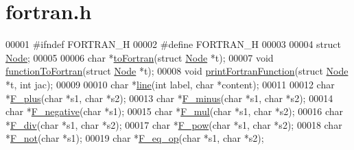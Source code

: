 \hypertarget{fortran_8h_source}{\section{fortran.\-h}
}

\begin{DoxyCode}
00001 \textcolor{preprocessor}{#ifndef FORTRAN\_H}
00002 \textcolor{preprocessor}{}\textcolor{preprocessor}{#define FORTRAN\_H}
00003 \textcolor{preprocessor}{}
00004 \textcolor{keyword}{struct }\hyperlink{structNode}{Node};
00005 
00006 \textcolor{keywordtype}{char} *\hyperlink{fortran_8c_a712ba008f0345618c5b1b87358a0206e}{toFortran}(\textcolor{keyword}{struct} \hyperlink{structNode}{Node} *t);
00007 \textcolor{keywordtype}{void} \hyperlink{fortran_8c_a2222da9d792b8540ffba7e25fbf4e4a4}{functionToFortran}(\textcolor{keyword}{struct} \hyperlink{structNode}{Node} *t);
00008 \textcolor{keywordtype}{void} \hyperlink{fortran_8c_a6d57af6f238f091e9c62b9ed81f194a3}{printFortranFunction}(\textcolor{keyword}{struct} \hyperlink{structNode}{Node} *t, \textcolor{keywordtype}{int} jac);
00009 
00010 \textcolor{keywordtype}{char} *\hyperlink{fortran_8c_a9a1c3a7f211f7d42c6dedcdaed68067e}{line}(\textcolor{keywordtype}{int} label, \textcolor{keywordtype}{char} *content);
00011 
00012 \textcolor{keywordtype}{char} *\hyperlink{fortran_8c_a02a98fd967252e6d807915856d09c77f}{F\_plus}(\textcolor{keywordtype}{char} *s1, \textcolor{keywordtype}{char} *s2);
00013 \textcolor{keywordtype}{char} *\hyperlink{fortran_8c_adc9b028cf89661eeb91182ab007da632}{F\_minus}(\textcolor{keywordtype}{char} *s1, \textcolor{keywordtype}{char} *s2);
00014 \textcolor{keywordtype}{char} *\hyperlink{fortran_8c_a0ca25a9453e2eeb469f1120368dd481f}{F\_negative}(\textcolor{keywordtype}{char} *s1);
00015 \textcolor{keywordtype}{char} *\hyperlink{fortran_8c_a1d67a9cba2734d4accc1f041aeab29dc}{F\_mul}(\textcolor{keywordtype}{char} *s1, \textcolor{keywordtype}{char} *s2);
00016 \textcolor{keywordtype}{char} *\hyperlink{fortran_8c_a0a05ea2fc6b0ca74871f60f1580fade0}{F\_div}(\textcolor{keywordtype}{char} *s1, \textcolor{keywordtype}{char} *s2);
00017 \textcolor{keywordtype}{char} *\hyperlink{fortran_8c_ab1deef2cd69a27b35060de99428d6002}{F\_pow}(\textcolor{keywordtype}{char} *s1, \textcolor{keywordtype}{char} *s2);
00018 \textcolor{keywordtype}{char} *\hyperlink{fortran_8c_ad039b3cb32f255dbab046b141de3b710}{F\_not}(\textcolor{keywordtype}{char} *s1);
00019 \textcolor{keywordtype}{char} *\hyperlink{fortran_8c_a46ec6c338eb4bc765f191f1c4c3a4b53}{F\_eq\_op}(\textcolor{keywordtype}{char} *s1, \textcolor{keywordtype}{char} *s2);

\end{DoxyCode}
